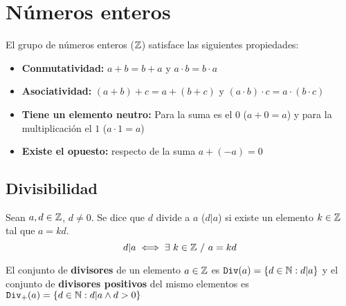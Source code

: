 \section{Números enteros}
El grupo de números enteros ($\mathbb{Z}$)  satisface las siguientes propiedades:
\begin{itemize}
    \item \textbf{Conmutatividad:} $a+b=b+a$ y $a\cdot b = b\cdot a$
    \item\textbf{Asociatividad:} $(a+b)+c = a+(b+c)$ y $(a\cdot b)\cdot c = a\cdot (b\cdot c)$
    \item \textbf{Tiene un elemento neutro:} Para la suma es el $0$ ($a+0 = a$) y para la multiplicación el $1$ ($a\cdot 1 = a$)
    \item \textbf{Existe el opuesto:} respecto de la suma $a + (-a) = 0$
    \end{itemize}
    

\subsection{Divisibilidad}
Sean $a,d\in\mathbb{Z}$, $d\neq0$. Se dice que $d$ divide a $a$ ($d|a$) si existe un elemento $k\in\mathbb{Z}$ tal que $a=kd$.
\begin{equation*}
    d|a \iff\exists~k\in\mathbb{Z}~ / ~a=kd
\end{equation*}

El conjunto de \textbf{divisores} de un elemento $a\in\mathbb{Z}$ es $\texttt{Div}(a) = \{d\in\mathbb{N} : d|a\}$ y el conjunto de \textbf{divisores positivos} del mismo elementos es $\texttt{Div}_{+}(a) = \{d\in\mathbb{N} : d|a \land d>0\}$

